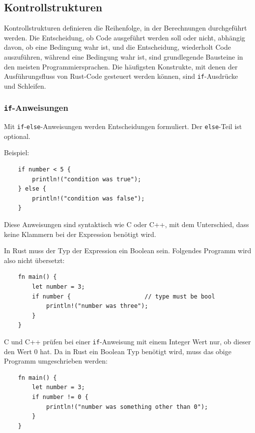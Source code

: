 \subsection{Kontrollstrukturen}

Kontrollstrukturen definieren die Reihenfolge, in der Berechnungen durchgeführt werden. Die Entscheidung, ob Code ausgeführt werden soll oder nicht, abhängig davon, ob eine Bedingung wahr ist, und die Entscheidung, wiederholt Code aus\-zu\-füh\-ren, während eine Bedingung wahr ist, sind grundlegende Bausteine in den meisten Programmiersprachen. Die häufigsten Konstrukte, mit denen der Ausführungsfluss von Rust-Code gesteuert werden können, sind \verb"if"-Ausdrücke und Schleifen.

\subsubsection{\texttt{if}-Anweisungen}

Mit \verb"if"-\verb"else"-Anweisungen werden Entscheidungen formuliert. Der \verb"else"-Teil ist optional.

Beispiel:

\begin{lstlisting}
    if number < 5 {
        println!("condition was true");
    } else {
        println!("condition was false");
    }
\end{lstlisting}

Diese Anweisungen sind syntaktisch wie C oder C++, mit dem Unterschied, dass keine Klammern bei der Expression benötigt wird.

In Rust muss der Typ der Expression ein Boolean sein. Folgendes Programm wird also nicht übersetzt:

\begin{lstlisting}
    fn main() {
        let number = 3;
        if number {                     // type must be bool
            println!("number was three");
        }
    }
\end{lstlisting}

C und C++ prüfen bei einer \verb"if"-Anweisung mit einem Integer Wert nur, ob dieser den Wert 0 hat. Da in Rust ein Boolean Typ benötigt wird, muss das obige Programm umgeschrieben werden:

\begin{lstlisting}
    fn main() {
        let number = 3;
        if number != 0 {
            println!("number was something other than 0");
        }
    }
\end{lstlisting}

